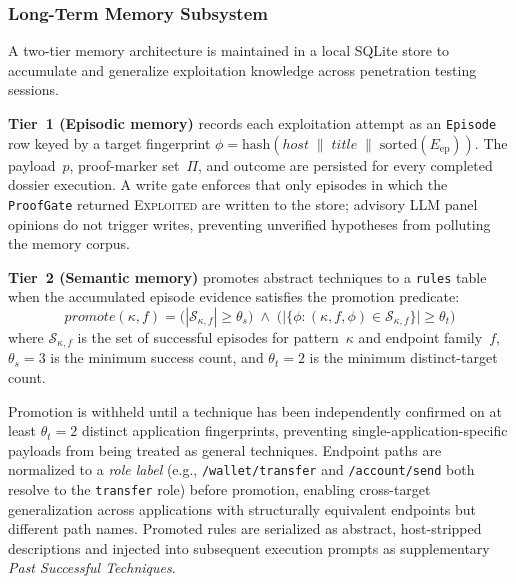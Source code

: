 \subsubsection{Long-Term Memory Subsystem}

A two-tier memory architecture is maintained in a local SQLite store to
accumulate and generalize exploitation knowledge across penetration
testing sessions.

\textbf{Tier~1 (Episodic memory)} records each exploitation attempt as
an \texttt{Episode} row keyed by a target fingerprint
$\phi = \mathrm{hash}(\mathit{host} \;\|\; \mathit{title} \;\|\;
\mathrm{sorted}(E_{\mathrm{ep}}))$.
The payload~$p$, proof-marker set~$\Pi$, and outcome are persisted for
every completed dossier execution.
A write gate enforces that only episodes in which the
\texttt{ProofGate} returned \textsc{Exploited} are written to the
store; advisory LLM panel opinions do not trigger writes,
preventing unverified hypotheses from polluting the memory corpus.

\textbf{Tier~2 (Semantic memory)} promotes abstract techniques to a
\texttt{rules} table when the accumulated episode evidence satisfies the
promotion predicate:
\begin{equation}
  \mathit{promote}(\kappa, f)
  = \bigl(|\mathcal{S}_{\kappa,f}| \geq \theta_s\bigr)
  \;\wedge\;
  \bigl(\bigl|\{\phi : (\kappa, f, \phi) \in \mathcal{S}_{\kappa,f}\}\bigr|
  \geq \theta_t\bigr)
  \label{eq:ltm_promote}
\end{equation}
where $\mathcal{S}_{\kappa,f}$ is the set of successful episodes for
pattern~$\kappa$ and endpoint family~$f$, $\theta_s = 3$ is the minimum
success count, and $\theta_t = 2$ is the minimum distinct-target count.

Promotion is withheld until a technique has been independently confirmed
on at least $\theta_t = 2$ distinct application fingerprints, preventing
single-application-specific payloads from being treated as general
techniques.
Endpoint paths are normalized to a \emph{role label}
(e.g., \texttt{/wallet/transfer} and \texttt{/account/send} both resolve
to the \texttt{transfer} role) before promotion, enabling cross-target
generalization across applications with structurally equivalent
endpoints but different path names.
Promoted rules are serialized as abstract, host-stripped descriptions
and injected into subsequent execution prompts as supplementary
\textit{Past Successful Techniques}.
